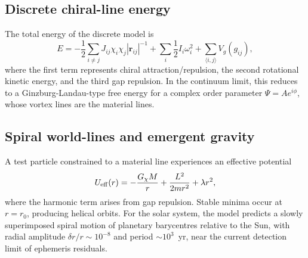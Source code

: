 \documentclass[12pt,a4paper]{article}
\begin{document}
\subsection*{Discrete chiral-line energy}

The total energy of the discrete model is
\begin{equation}
    E = -\frac12\sum_{i\neq j} J_{ij}\chi_i\chi_j |\mathbf{r}_{ij}|^{-1}
    + \sum_i \frac12 I_i\omega_i^2
    + \sum_{\langle i,j\rangle} V_g(g_{ij}),
\end{equation}
where the first term represents chiral attraction/repulsion, the second rotational kinetic energy, and the third gap repulsion. In the continuum limit, this reduces to a Ginzburg-Landau-type free energy for a complex order parameter $\Psi=Ae^{i\phi}$, whose vortex lines are the material lines.

\subsection*{Spiral world-lines and emergent gravity}

A test particle constrained to a material line experiences an effective potential
\begin{equation}
    U_{\rm eff}(r) = -\frac{G_\chi M}{r} + \frac{L^2}{2mr^2} + \lambda r^2,
\end{equation}
where the harmonic term arises from gap repulsion. Stable minima occur at $r=r_0$, producing helical orbits. For the solar system, the model predicts a slowly superimposed spiral motion of planetary barycentres relative to the Sun, with radial amplitude $\delta r/r\sim 10^{-8}$ and period $\sim 10^3$~yr, near the current detection limit of ephemeris residuals.
\end{document}
